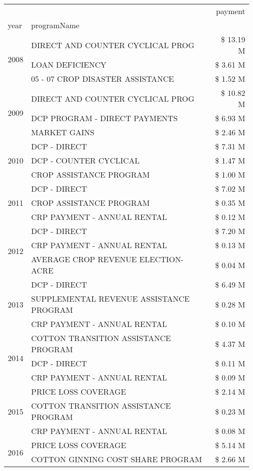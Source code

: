 \begin{tabular}{llr}
\toprule
 &  & payment \\
year & programName &  \\
\midrule
\multirow[t]{3}{*}{2008} & DIRECT AND COUNTER CYCLICAL PROG & \$ 13.19 M \\
 & LOAN DEFICIENCY & \$ 3.61 M \\
 & 05 - 07 CROP DISASTER ASSISTANCE & \$ 1.52 M \\
\cline{1-3}
\multirow[t]{3}{*}{2009} & DIRECT AND COUNTER CYCLICAL PROG & \$ 10.82 M \\
 & DCP PROGRAM - DIRECT PAYMENTS & \$ 6.93 M \\
 & MARKET GAINS & \$ 2.46 M \\
\cline{1-3}
\multirow[t]{3}{*}{2010} & DCP - DIRECT & \$ 7.31 M \\
 & DCP - COUNTER CYCLICAL & \$ 1.47 M \\
 & CROP ASSISTANCE PROGRAM & \$ 1.00 M \\
\cline{1-3}
\multirow[t]{3}{*}{2011} & DCP - DIRECT & \$ 7.02 M \\
 & CROP ASSISTANCE PROGRAM & \$ 0.35 M \\
 & CRP PAYMENT - ANNUAL RENTAL & \$ 0.12 M \\
\cline{1-3}
\multirow[t]{3}{*}{2012} & DCP - DIRECT & \$ 7.20 M \\
 & CRP PAYMENT - ANNUAL RENTAL & \$ 0.13 M \\
 & AVERAGE CROP REVENUE ELECTION-ACRE & \$ 0.04 M \\
\cline{1-3}
\multirow[t]{3}{*}{2013} & DCP - DIRECT & \$ 6.49 M \\
 & SUPPLEMENTAL REVENUE ASSISTANCE PROGRAM & \$ 0.28 M \\
 & CRP PAYMENT - ANNUAL RENTAL & \$ 0.10 M \\
\cline{1-3}
\multirow[t]{3}{*}{2014} & COTTON TRANSITION ASSISTANCE PROGRAM & \$ 4.37 M \\
 & DCP - DIRECT & \$ 0.11 M \\
 & CRP PAYMENT - ANNUAL RENTAL & \$ 0.09 M \\
\cline{1-3}
\multirow[t]{3}{*}{2015} & PRICE LOSS COVERAGE & \$ 2.14 M \\
 & COTTON TRANSITION ASSISTANCE PROGRAM & \$ 0.23 M \\
 & CRP PAYMENT - ANNUAL RENTAL & \$ 0.08 M \\
\cline{1-3}
\multirow[t]{3}{*}{2016} & PRICE LOSS COVERAGE & \$ 5.14 M \\
 & COTTON GINNING COST SHARE PROGRAM & \$ 2.66 M \\

\end{tabular}
